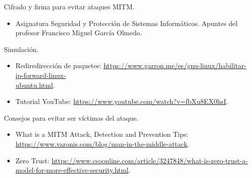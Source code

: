 \documentclass[11pt]{article}
\begin{document}
Cifrado y firma para evitar ataques MITM.
\begin{itemize}
	\item Asignatura Seguridad y Protección de Sistemas Informáticos. Apuntes del profesor Francisco Miguel García Olmedo.
\end{itemize}

Simulación.
\begin{itemize}
	\item Rediredirección de paquetes: \href{https://www.garron.me/es/gnu-linux/habilitar-ip-forward-linux-ubuntu.html}{https://www.garron.me/es/gnu-linux/habilitar-ip-forward-linux-\\ubuntu.html}.
	\item Tutorial YouTube: \href{https://www.youtube.com/watch?v=fbXu8EX0hsI}{https://www.youtube.com/watch?v=fbXu8EX0hsI}.
\end{itemize}

Consejos para evitar ser víctimas del ataque.
\begin{itemize}
	\item What is a MITM Attack, Detection and Prevention Tips: \href{https://www.varonis.com/blog/man-in-the-middle-attack}{https://www.varonis.com/blog/man-in-the-middle-attack}.
	\item Zero Trust: \href{https://www.csoonline.com/article/3247848/what-is-zero-trust-a-model-for-more-effective-security.html}{https://www.csoonline.com/article/3247848/what-is-zero-trust-a-model-for-more-effective-security.html}.
\end{itemize}
\end{document}
